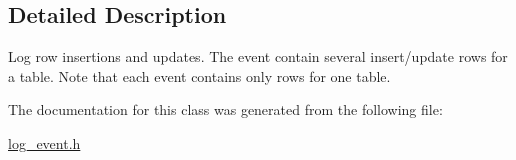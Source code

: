 \subsection{Detailed Description}
Log row insertions and updates. The event contain several insert/update rows for a table. Note that each event contains only rows for one table. 

The documentation for this class was generated from the following file\+:\begin{DoxyCompactItemize}
\item 
\mbox{\hyperlink{log__event_8h}{log\+\_\+event.\+h}}\end{DoxyCompactItemize}
